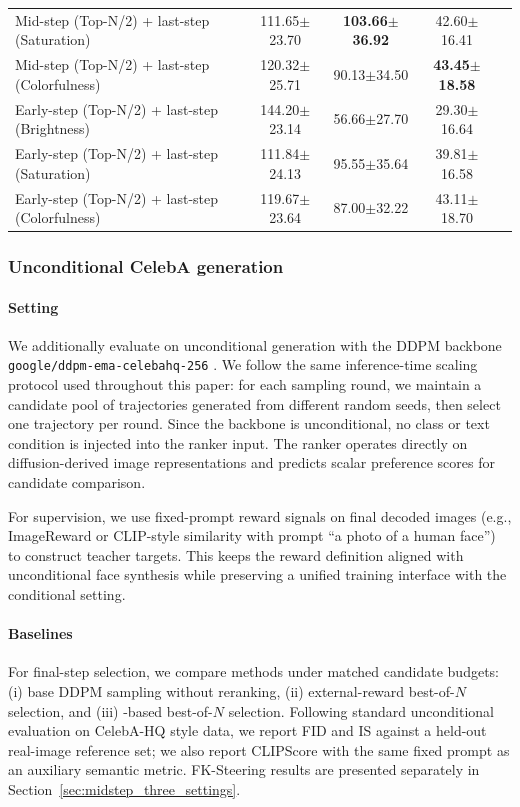 \documentclass{article}
\newcommand{\method}{\text{Diffusion Ranker}\xspace}
\begin{document}
\begin{table}[t]
\begin{tabular}{lcccc}
Mid-step (Top-N/2) + last-step (Saturation) & 111.65$\pm$23.70 & \textbf{103.66$\pm$36.92} & 42.60$\pm$16.41 \\
Mid-step (Top-N/2) + last-step (Colorfulness) & 120.32$\pm$25.71 & 90.13$\pm$34.50 & \textbf{43.45$\pm$18.58} \\
\midrule
Early-step (Top-N/2) + last-step (Brightness) & 144.20$\pm$23.14 & 56.66$\pm$27.70 & 29.30$\pm$16.64 \\
Early-step (Top-N/2) + last-step (Saturation) & 111.84$\pm$24.13 & 95.55$\pm$35.64 & 39.81$\pm$16.58 \\
Early-step (Top-N/2) + last-step (Colorfulness) & 119.67$\pm$23.64 & 87.00$\pm$32.22 & 43.11$\pm$18.70 \\
\bottomrule
\end{tabular}
\label{tab:cifar10}
\end{table}





\subsubsection{Unconditional CelebA generation}
\label{sec:exp_uncond_ddpm}

\paragraph{Setting}
We additionally evaluate \method on unconditional generation with the DDPM backbone \texttt{google/ddpm-ema-celebahq-256} \citep{ho2020ddpm}. We follow the same inference-time scaling protocol used throughout this paper: for each sampling round, we maintain a candidate pool of trajectories generated from different random seeds, then select one trajectory per round. Since the backbone is unconditional, no class or text condition is injected into the ranker input. The ranker operates directly on diffusion-derived image representations and predicts scalar preference scores for candidate comparison.

For supervision, we use fixed-prompt reward signals on final decoded images (e.g., ImageReward or CLIP-style similarity with prompt ``a photo of a human face'') to construct teacher targets. This keeps the reward definition aligned with unconditional face synthesis while preserving a unified training interface with the conditional setting.

\paragraph{Baselines}
For final-step selection, we compare methods under matched candidate budgets: (i) base DDPM sampling without reranking, (ii) external-reward best-of-$N$ selection, and (iii) \method-based best-of-$N$ selection. Following standard unconditional evaluation on CelebA-HQ style data, we report FID and IS against a held-out real-image reference set; we also report CLIPScore with the same fixed prompt as an auxiliary semantic metric. FK-Steering results are presented separately in Section~\ref{sec:midstep_three_settings}.
\end{document}

